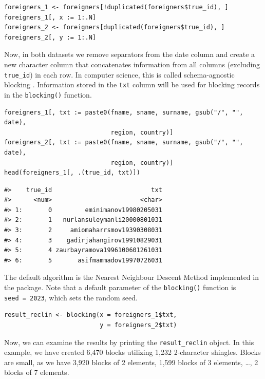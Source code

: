 \begin{verbatim}
foreigners_1 <- foreigners[!duplicated(foreigners$true_id), ]
foreigners_1[, x := 1:.N]
foreigners_2 <- foreigners[duplicated(foreigners$true_id), ]
foreigners_2[, y := 1:.N]
\end{verbatim}

Now, in both datasets we remove separators from the date column and
create a new character column that concatenates information from all
columns (excluding \texttt{true\_id}) in each row. In computer science, this is called schema-agnostic blocking \citep[cf.~][]{papadakis2016schema}. Information stored in the
\texttt{txt} column will be used for blocking records in the \texttt{blocking()}
function.

\begin{verbatim}
foreigners_1[, txt := paste0(fname, sname, surname, gsub("/", "", date), 
                             region, country)]
foreigners_2[, txt := paste0(fname, sname, surname, gsub("/", "", date), 
                             region, country)]
head(foreigners_1[, .(true_id, txt)])
\end{verbatim}

\begin{verbatim}
#>    true_id                           txt
#>      <num>                        <char>
#> 1:       0         eminimanov19980205031
#> 2:       1   nurlansuleymanli20000801031
#> 3:       2     amiomaharrsmov19390308031
#> 4:       3    gadirjahangirov19910829031
#> 5:       4 zaurbayramova1996100601261031
#> 6:       5       asifmammadov19970726031
\end{verbatim}

The default algorithm is the Nearest Neighbour Descent Method
\citep{Dong2011} implemented in the  package. Note that a
default parameter of the \texttt{blocking()} function is \texttt{seed\ =\ 2023}, which
sets the random seed.

\begin{verbatim}
result_reclin <- blocking(x = foreigners_1$txt,
                          y = foreigners_2$txt)
\end{verbatim}

Now, we can examine the results by printing the \texttt{result\_reclin} object.
In this example, we have created
6,470
blocks utilizing
1,232 2-character
shingles. Blocks are small, as we have
3,920 blocks of 2
elements, 1,599 blocks of
3 elements, \ldots,
2 blocks of
7 elements.



